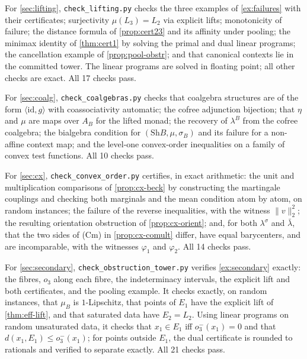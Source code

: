 \documentclass[11pt]{article}
\theoremstyle{definition}
\theoremstyle{remark}
\newcommand{\Sh}{\mathrm{Sh}}
\newcommand{\id}{\mathrm{id}}
\newcommand{\lb}{\bar\lambda}
\newcommand{\ls}{\lambda^{\sigma}}
\begin{document}
For \cref{sec:lifting}, \texttt{check\_lifting.py} checks the three examples of
\cref{ex:failures} with their certificates; surjectivity $\mu(L_3)=L_2$ via explicit lifts;
monotonicity of failure; the distance formula of \cref{prop:cert23} and its affinity under pooling;
the minimax identity of \cref{thm:cert1} by solving the primal and dual linear programs; the
cancellation example of \cref{prop:pool-obstr}; and that canonical contexts lie in the committed
tower. The linear programs are solved in floating point; all other checks are exact. All 17 checks
pass.

For \cref{sec:coalg}, \texttt{check\_coalgebras.py} checks that coalgebra structures are of the form
$\langle\id,g\rangle$ with coassociativity automatic; the cofree adjunction bijection; that $\eta$ and
$\mu$ are maps over $A_B$ for the lifted monad; the recovery of $\lambda^B$ from the cofree coalgebra;
the bialgebra condition for $(\Sh B,\mu,\sigma_B)$ and its failure for a non-affine context map; and
the level-one convex-order inequalities on a family of convex test functions. All 10 checks pass.

For \cref{sec:cx}, \texttt{check\_convex\_order.py} certifies, in exact arithmetic: the unit and
multiplication comparisons of \cref{prop:cx-beck} by constructing the martingale couplings and checking
both marginals and the mean condition atom by atom, on random instances; the failure of the reverse
inequalities, with the witness $\lVert v\rVert_2^2$; the resulting orientation obstruction of
\cref{prop:cx-orient}; and, for both $\ls$ and $\lb$, that the two sides of (Cm) in
\cref{prop:cx-comult} differ, have equal barycenters, and are incomparable, with the witnesses
$\varphi_1$ and $\varphi_2$. All 14 checks pass.

For \cref{sec:secondary}, \texttt{check\_obstruction\_tower.py} verifies \cref{ex:secondary} exactly:
the fibres, $o_3$ along each fibre, the indeterminacy intervals, the explicit lift and both
certificates, and the pooling example. It checks exactly, on random instances, that $\mu_B$ is
$1$-Lipschitz, that points of $E_1$ have the explicit lift of \cref{thm:eff-lift}, and that saturated
data have $E_2=L_2$. Using linear programs on random unsaturated data, it checks that $x_1\in E_1$ iff
$o_3^-(x_1)=0$ and that $d(x_1,E_1)\le o_3^-(x_1)$; for points outside $E_1$, the dual certificate is
rounded to rationals and verified to separate exactly. All 21 checks pass.
\end{document}
